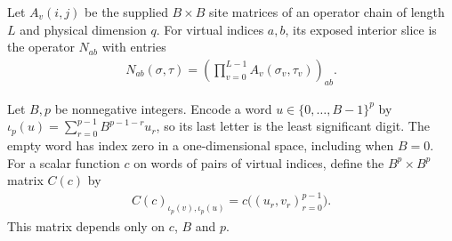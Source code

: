 \begin{definition}
    \label{def:trace_core_matrix_slice}
    Let $A_v(i,j)$ be the supplied $B\times B$ site matrices of an operator
    chain of length $L$ and physical dimension $q$. For virtual indices
    $a,b$, its exposed interior slice is the operator $N_{ab}$ with entries
    \begin{align}
        N_{ab}(\sigma,\tau)
        =\left(\prod_{v=0}^{L-1}A_v(\sigma_v,\tau_v)\right)_{ab}.
        \label{eq:trace_core_matrix_slice}
    \end{align}
\end{definition}

\begin{definition}
    \label{def:trace_core_word_closing}
    Let $B,p$ be nonnegative integers. Encode a word
    $u\in\{0,\ldots,B-1\}^p$ by
    $\iota_p(u)=\sum_{r=0}^{p-1}B^{p-1-r}u_r$, so its last letter is the
    least significant digit. The empty word has index zero in a
    one-dimensional space, including when $B=0$.
    For a scalar function $c$ on words of pairs of virtual indices, define
    the $B^p\times B^p$ matrix $C(c)$ by
    \begin{align}
        C(c)_{\iota_p(v),\iota_p(u)}
        =c\bigl((u_r,v_r)_{r=0}^{p-1}\bigr).
        \label{eq:trace_core_word_closing}
    \end{align}
    This matrix depends only on $c$, $B$ and $p$.
\end{definition}

